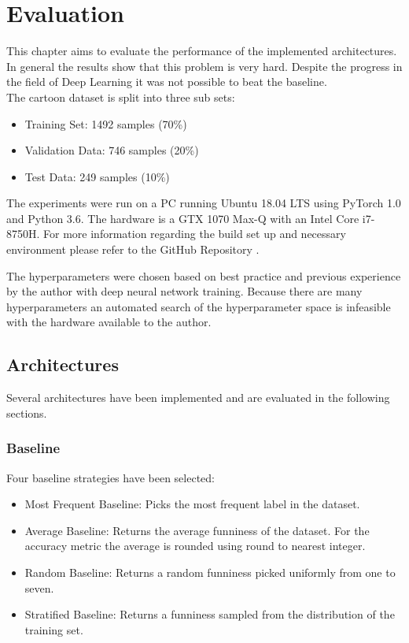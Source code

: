 \documentclass[draft,final,oneside]{vutinfth} %
\begin{document}
\chapter{Evaluation}

This chapter aims to evaluate the performance of the implemented architectures. In
general the results show that this problem is very hard. Despite the progress in the field of Deep Learning it was not possible to beat the baseline. \\

The cartoon dataset is split into three sub sets:

\begin{itemize}
\item Training Set: 1492 samples (70\%)
\item Validation Data: 746 samples (20\%)
\item Test Data: 249 samples (10\%)
\end{itemize}

The experiments were run on a PC running Ubuntu 18.04 LTS using PyTorch 1.0 and
Python 3.6. The hardware is a GTX 1070 Max-Q with an Intel Core i7-8750H. For more
information regarding the build set up and necessary environment please refer to the GitHub Repository \cite{deephumorrepo}.

The hyperparameters were chosen based on best practice and previous
experience by the author with deep neural network training. Because there are many hyperparameters an automated search of the hyperparameter space is infeasible with the hardware available to the author.

\section{Architectures}
Several architectures have been implemented and are evaluated in the following sections.


\subsection{Baseline}

Four baseline strategies have been selected: 

\begin{itemize}

\item Most Frequent Baseline: Picks the most frequent label in the dataset.
\item Average Baseline: Returns the average funniness of the dataset. For the accuracy metric the average is rounded using round to nearest integer.
\item Random Baseline: Returns a random funniness picked uniformly from one to seven.
\item Stratified Baseline: Returns a funniness sampled from the distribution of the
training set.

\end{itemize}
\end{document}
